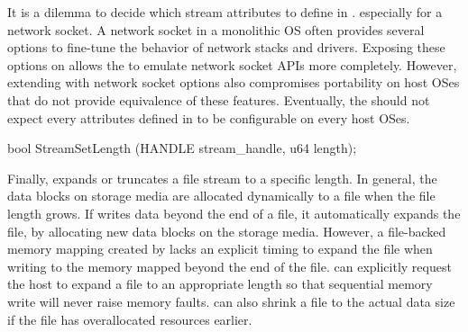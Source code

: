 It is a dilemma 
to decide which stream attributes
to define in .
especially for a network socket.
A network socket in a monolithic OS often provides several options to fine-tune the behavior of network stacks and drivers.
Exposing these options on \thehostabi{} allows the \libos{} to emulate network socket APIs more completely.
However, extending \thehostabi{} with network socket options also compromises portability
on host OSes that do not provide equivalence of these features.
Eventually, the \libos{} should not expect every attributes defined in  to be configurable on every host OSes.













\begin{paldef}
bool StreamSetLength (HANDLE stream_handle, u64 length);
\end{paldef}


Finally,  expands or truncates a file stream to a specific length.
In general, the data blocks on storage media are allocated dynamically
to a file when the file length grows.
If  writes data beyond the end of a file, it automatically expands the file, by allocating new data blocks on the storage media.
However, a file-backed memory mapping created by 
lacks an explicit timing to expand the file
when writing to the memory mapped beyond the end of the file.
 can explicitly request the host to expand a file to an appropriate length
so that sequential memory write will never raise memory faults.
 can also shrink a file to the actual data size
if the file has overallocated resources earlier.


